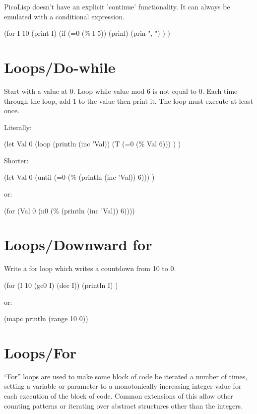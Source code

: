 \begin{itemize}
\begin{wideverbatim}

PicoLisp doesn't have an explicit 'continue' functionality. It can always be
emulated with a conditional expression.

(for I 10
   (print I)
   (if (=0 (\% I 5))
      (prinl)
      (prin ", ") ) )

\end{wideverbatim}

\pagebreak{}
\section*{Loops/Do-while}

Start with a value at 0. Loop while value mod 6 is not equal to 0. Each
time through the loop, add 1 to the value then print it. The loop must
execute at least once.

\begin{wideverbatim}

Literally:

(let Val 0
   (loop
      (println (inc 'Val))
      (T (=0 (\% Val 6))) ) )

Shorter:

(let Val 0
   (until (=0 (\% (println (inc 'Val)) 6))) )

or:

(for (Val 0  (n0 (\% (println (inc 'Val)) 6))))

\end{wideverbatim}

\pagebreak{}
\section*{Loops/Downward for}

Write a for loop which writes a countdown from 10 to 0.

\begin{wideverbatim}

(for (I 10 (ge0 I) (dec I))
   (println I) )

or:

(mapc println (range 10 0))

\end{wideverbatim}

\pagebreak{}
\section*{Loops/For}

``For'' loops are used to make some block of code be iterated a number
of times, setting a variable or parameter to a monotonically increasing
integer value for each execution of the block of code. Common extensions
of this allow other counting patterns or iterating over abstract
structures other than the integers.


\end{itemize}

